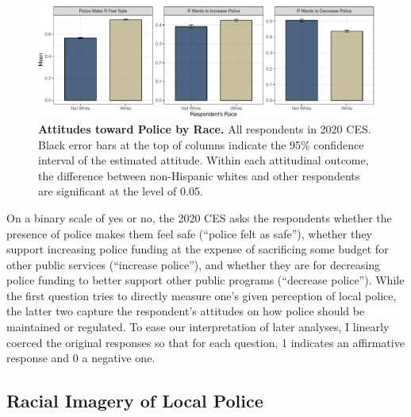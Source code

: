 \documentclass[
  12pt,
]{article}
\begin{document}
\begin{figure}[ht]

{\centering \includegraphics{racialized-police_files/figure-pdf/fig-attitudes-1.pdf}

}

\caption{\label{fig-attitudes}\textbf{Attitudes toward Police by Race.}
All respondents in 2020 CES. Black error bars at the top of columns
indicate the 95\% confidence interval of the estimated attitude. Within
each attitudinal outcome, the difference between non-Hispanic whites and
other respondents are significant at the level of 0.05.}

\end{figure}

On a binary scale of yes or no, the 2020 CES asks the respondents
whether the presence of police makes them feel safe (``police felt as
safe''), whether they support increasing police funding at the expense
of sacrificing some budget for other public services (``increase
police''), and whether they are for decreasing police funding to better
support other public programs (``decrease police''). While the first
question tries to directly measure one's given perception of local
police, the latter two capture the respondent's attitudes on how police
should be maintained or regulated. To ease our interpretation of later
analyses, I linearly coerced the original responses so that for each
question, 1 indicates an affirmative response and 0 a negative one.

\hypertarget{racial-imagery-of-local-police}{%
\subsection{Racial Imagery of Local
Police}\label{racial-imagery-of-local-police}}
\end{document}
